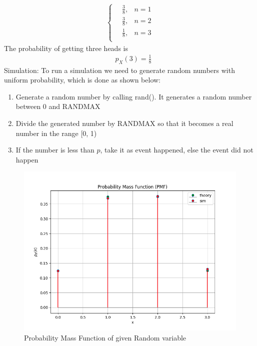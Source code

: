 \documentclass[journal]{IEEEtran}
\begin{document}
\begin{enumerate}
\begin{align}
\begin{cases}
\quad \frac{3}{8}, & n = 1 \\
\quad \frac{3}{8}, & n = 2 \\
\quad \frac{1}{8}, & n = 3 \\
\end{cases}
\end{align}
The probability of getting three heads is
\begin{align}
\quad p_X(3) = \frac{1}{8}
\end{align}
Simulation:
\newline
To run a simulation we need to generate random numbers with uniform probability, which is done
as shown below:
\begin{enumerate}
  \item Generate a random number by calling rand(). It generates a random number between 0 and RANDMAX
  \item Divide the generated number by RANDMAX so that it becomes a real number in the range [0, 1)
  \item If the number is less than $p$, take it as event happened, else the event did not happen
\end{enumerate}
\begin{figure}[h!]
   \centering
   \includegraphics[width=\columnwidth]{figs/pmf.png}
    \caption{Probability Mass Function of given Random variable}
\end{figure}
\begin{figure}[h!]
   \centering

\end{figure}
\end{enumerate}
\end{document}
